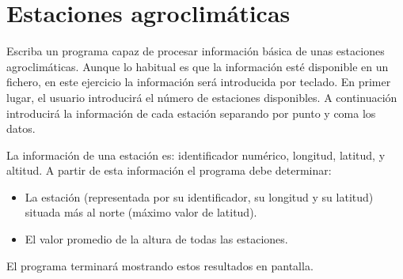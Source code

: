 \documentclass[a4paper]{article}
\begin{document}
\section{Estaciones agroclimáticas}
\label{sec:org527afa1}

Escriba un programa capaz de procesar información básica de unas estaciones agroclimáticas. Aunque lo habitual es que la información esté disponible en un fichero, en este ejercicio la información será introducida por teclado. En primer lugar, el usuario introducirá el número de estaciones disponibles. A continuación introducirá la información de cada estación separando por punto y coma los datos. 

La información de una estación es: identificador numérico, longitud, latitud, y altitud.  A partir de esta información el programa debe determinar:
\begin{itemize}
\item La estación (representada por su identificador, su longitud y su latitud) situada más al norte (máximo valor de latitud).
\item El valor promedio de la altura de todas las estaciones.
\end{itemize}

El programa terminará mostrando estos resultados en pantalla.
\end{document}
